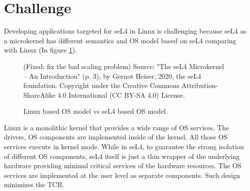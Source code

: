 \section{Challenge}

Developing applications targeted for seL4 in Linux is challenging because seL4 as a microkernel has different semantics and OS model based on seL4 comparing with Linux (In figure \ref{fig:osmodel}).

\begin{figure}[h] (Fixed: fix the bad scaling problem)
    \centering
    {Source: "The seL4 Microkernel – An Introduction" (p. 3), by Gernot Heiser, 2020, the seL4 foundation. Copyright  under the Creative Commons Attribution-ShareAlike 4.0 International (CC BY-SA 4.0) License.}
    
    \caption{Linux based OS model vs seL4 based OS model.}
    \label{fig:osmodel}
\end{figure}

Linux is a monolithic kernel that provides a wide range of OS services. The drivers, OS components are implemented inside of the kernel. All those OS services execute in kernel mode. While in seL4, to guarantee the strong isolation of different OS components, seL4 itself is just a thin wrapper of the underlying hardware providing minimal critical services of the hardware resources. The OS services are implemented at the user level as separate components. Such design minimizes the TCB. 

